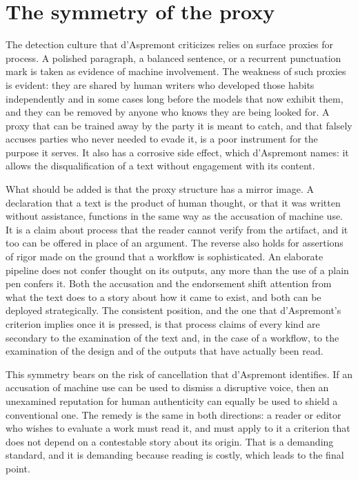 \documentclass[12pt]{article}
\begin{document}
\section{The symmetry of the proxy}

The detection culture that d'Aspremont criticizes relies on surface proxies for process. A polished paragraph, a balanced sentence, or a recurrent punctuation mark is taken as evidence of machine involvement. The weakness of such proxies is evident: they are shared by human writers who developed those habits independently and in some cases long before the models that now exhibit them, and they can be removed by anyone who knows they are being looked for. A proxy that can be trained away by the party it is meant to catch, and that falsely accuses parties who never needed to evade it, is a poor instrument for the purpose it serves. It also has a corrosive side effect, which d'Aspremont names: it allows the disqualification of a text without engagement with its content.

What should be added is that the proxy structure has a mirror image. A declaration that a text is the product of human thought, or that it was written without assistance, functions in the same way as the accusation of machine use. It is a claim about process that the reader cannot verify from the artifact, and it too can be offered in place of an argument. The reverse also holds for assertions of rigor made on the ground that a workflow is sophisticated. An elaborate pipeline does not confer thought on its outputs, any more than the use of a plain pen confers it. Both the accusation and the endorsement shift attention from what the text does to a story about how it came to exist, and both can be deployed strategically. The consistent position, and the one that d'Aspremont's criterion implies once it is pressed, is that process claims of every kind are secondary to the examination of the text and, in the case of a workflow, to the examination of the design and of the outputs that have actually been read.

This symmetry bears on the risk of cancellation that d'Aspremont identifies. If an accusation of machine use can be used to dismiss a disruptive voice, then an unexamined reputation for human authenticity can equally be used to shield a conventional one. The remedy is the same in both directions: a reader or editor who wishes to evaluate a work must read it, and must apply to it a criterion that does not depend on a contestable story about its origin. That is a demanding standard, and it is demanding because reading is costly, which leads to the final point.
\end{document}
